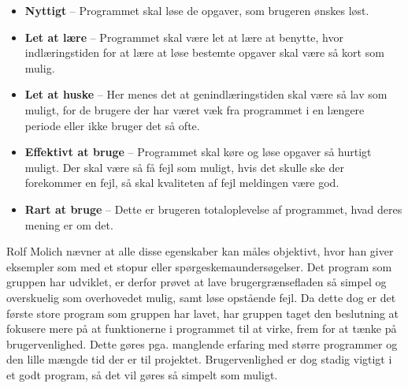 \begin{itemize}
	\item \textbf{Nyttigt} – Programmet skal løse de opgaver, som brugeren ønskes løst. 
	\item \textbf{Let at lære} – Programmet skal være let at lære at benytte, hvor indlæringstiden for at lære at løse bestemte opgaver skal være så kort som mulig.
	\item \textbf{Let at huske} – Her menes det at genindlæringstiden skal være så lav som muligt, for de brugere der har været væk fra programmet i en længere periode eller ikke bruger det så ofte. 
	\item \textbf{Effektivt at bruge} – Programmet skal køre og løse opgaver så hurtigt muligt. Der skal være så få fejl som muligt, hvis det skulle ske der forekommer en fejl, så skal kvaliteten af fejl meldingen være god.
	\item \textbf{Rart at bruge} – Dette er brugeren totaloplevelse af programmet, hvad deres mening er om det.
\end{itemize}

Rolf Molich nævner at alle disse egenskaber kan måles objektivt, hvor han giver eksempler som med et stopur eller spørgeskemaundersøgelser. Det program som gruppen har udviklet, er derfor prøvet at lave brugergrænsefladen så simpel og overskuelig som overhovedet mulig, samt løse opstående fejl. Da dette dog er det første store program som gruppen har lavet, har gruppen taget den beslutning at fokusere mere på at funktionerne i programmet til at virke, frem for at tænke på brugervenlighed.  Dette gøres pga. manglende erfaring med større programmer og den lille mængde tid der er til projektet. Brugervenlighed er dog stadig vigtigt i et godt program, så det vil gøres så simpelt som muligt. 